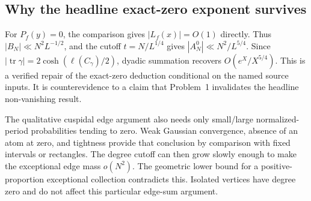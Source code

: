 \documentclass[10pt]{article}
\begin{document}
\subsection*{Why the headline exact-zero exponent survives}
For \(P_f(y)=0\), the comparison gives \(|L_f(x)|=O(1)\) directly. Thus \(|B_N|\ll N^2L^{-1/2}\), and the cutoff \(t=N/L^{1/4}\) gives \(|A_N^0|\ll N^2/L^{5/4}\). Since \(|\operatorname{tr}\gamma|=2\cosh(\ell(C_\gamma)/2)\), dyadic summation recovers \(O(e^X/X^{5/4})\). This is a verified repair of the exact-zero deduction conditional on the named source inputs. It is counterevidence to a claim that Problem 1 invalidates the headline non-vanishing result.\par
The qualitative cuspidal edge argument also needs only small/large normalized-period probabilities tending to zero. Weak Gaussian convergence, absence of an atom at zero, and tightness provide that conclusion by comparison with fixed intervals or rectangles. The degree cutoff can then grow slowly enough to make the exceptional edge mass \(o(N^2)\). The geometric lower bound for a positive-proportion exceptional collection contradicts this. Isolated vertices have degree zero and do not affect this particular edge-sum argument.\par
\end{document}
